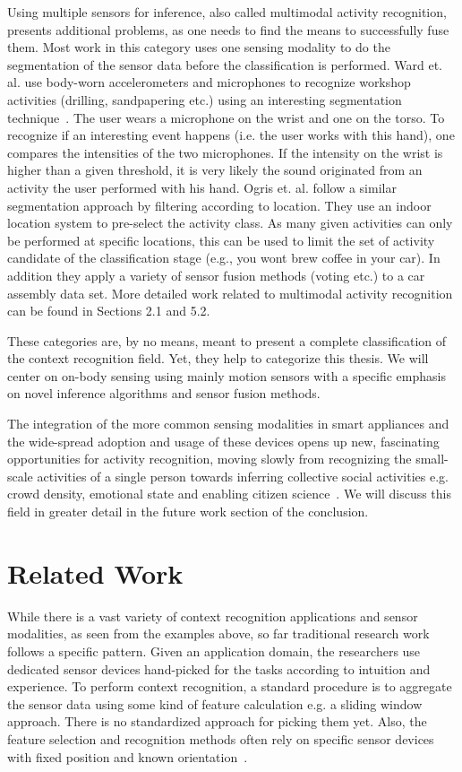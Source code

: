 Using multiple sensors for inference, also called multimodal activity 
recognition, presents additional problems, as one needs to find
the means to successfully fuse them. Most work in this category uses
one sensing modality to do the segmentation of the sensor data
before the classification is performed. 
Ward et. al. use body-worn accelerometers and
microphones to recognize workshop activities (drilling, sandpapering etc.) 
using an interesting segmentation technique~\cite{springerlink:10.1007/978-3-540-24646-6_2}. 
The user wears a microphone on the
wrist and one on the torso. To recognize if an interesting event happens (i.e. the user works with this hand), 
one compares the
intensities of the two microphones. If the intensity on the wrist is higher
than a given threshold, it is very likely the sound originated from an 
activity the user performed with his hand.
Ogris et. al. follow a similar segmentation approach by filtering according to location.
They use an indoor location system to pre-select the activity class.
As many given activities can only be performed at specific locations, this
can be used to limit the set of activity candidate of the classification stage
(e.g., you wont brew coffee in your car). In addition they apply a variety
of sensor fusion methods (voting etc.) to a car assembly data set.
More detailed work related to multimodal activity recognition can be found
in Sections 2.1 and 5.2.

These categories are, by no means, meant to present a complete classification
of the context recognition field. Yet, they help to categorize this thesis.
We will center on on-body sensing using mainly motion sensors 
with a specific emphasis on novel inference algorithms and sensor fusion methods.

The integration of the more common sensing modalities in smart appliances and the
wide-spread adoption and usage of these devices opens
up new, fascinating opportunities for activity recognition, moving slowly 
from recognizing the small-scale activities of a single person 
towards inferring collective social activities 
e.g. crowd density, emotional state and enabling citizen science~\cite{Eagle:2006p1070,Aoki:2008p1188}.
We will discuss this field in greater detail in the future work section of the conclusion.

\section{Related Work}
\label{mot:relatedwork}
While there is a vast variety of context recognition applications and sensor
modalities, as seen from the examples
above, so far traditional research work follows a specific
pattern. Given an application domain, the researchers use dedicated
sensor devices hand-picked for the tasks according to intuition and experience.
 To perform context recognition, a standard procedure is to aggregate the sensor data using some kind of feature calculation e.g. a
sliding window approach. There is no standardized approach
for picking them yet. Also, the feature selection and recognition
methods often rely on specific sensor devices with fixed position and
known orientation~\cite{lukowicz2004recognizing,mantyjarvi2001recognizing,kern2003multi}.

